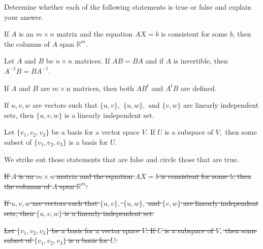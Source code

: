 \documentclass{ximera}
\author{Matthew Carr \& Marty Golubitsky}
\begin{document}

\begin{exercise}\label{mc.exercise14}

Determine whether each of the following statements is true or false and explain your answer.  
\begin{enumeratea}%
\item If $A$ is an $m\times n$ matrix and the equation $AX=b$ is consistent for some $b$, then the columns of $A$ span $\mathbb{R}^m$.
\item Let $A$ and $B$ be $n\times n$ matrices. If $AB = BA$ and if $A$ is invertible, then $A^{-1} B= B A^{-1}$. 
\item If $A$ and $B$ are $m\times$n matrices, then both $AB^t$ and $A^t B$ are defined.
\item If $u,v,w$ are vectors such that $\{u,v\},$ $\{u,w\},$ and $\{v,w\}$ are linearly independent sets, then $\{u,v,w\}$ is a linearly independent set.
\item Let $\{v_1,v_2,v_3\}$ be a basis for a vector space $V$. If $U$ is a subspace of $V,$ then some subset of $\{v_1,v_2,v_3\}$ is a basis for $U$.
\end{enumeratea}
\begin{solution}

\ans 
We strike out those statements that are false and circle those that are true.
\begin{enumeratea}%
\item \sout{If $A$ is an $m\times n$ matrix and the equation $AX=b$ is consistent for some $b$, then the columns of $A$ span $\mathbb{R}^m$.}
\item {}
\item {}
\item \sout{If $u,v,w$ are vectors such that $\{u,v\},$ $\{u,w\},$ and $\{v,w\}$ are linearly independent sets, then $\{u,v,w\}$ is a linearly independent set.}
\item \sout{Let $\{v_1,v_2,v_3\}$ be a basis for a vector space $V$. If $U$ is a subspace of $V,$ then some subset of $\{v_1,v_2,v_3\}$ is a basis for $U$.}
\end{enumeratea}


\end{solution}
\end{exercise}
\end{document}
